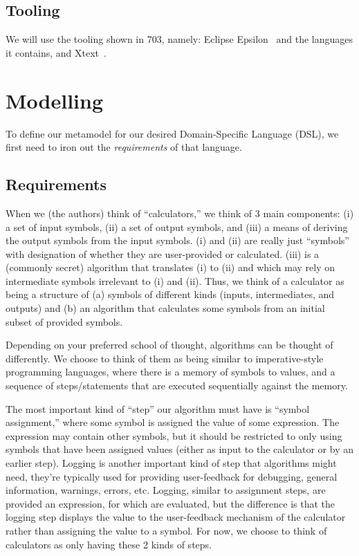 \documentclass[11pt,fleqn]{article}
\begin{document}
\subsection{Tooling}
\label{sec:introduction:subsec:tooling}

We will use the tooling shown in 703, namely: Eclipse Epsilon~\cite{Epsilon} and
the languages it contains, and Xtext~\cite{Xtext}.

\newpage{}

\section{Modelling}
\label{sec:modelling}

To define our metamodel for our desired Domain-Specific Language (DSL), we first
need to iron out the \textit{requirements} of that language.

\subsection{Requirements}
\label{sec:modelling:subsec:requirements}

When we (the authors) think of ``calculators,'' we think of 3 main components:
(i) a set of input symbols, (ii) a set of output symbols, and (iii) a means of
deriving the output symbols from the input symbols. (i) and (ii) are really just
``symbols'' with designation of whether they are user-provided or calculated.
(iii) is a (commonly secret) algorithm that translates (i) to (ii) and which may
rely on intermediate symbols irrelevant to (i) and (ii). Thus, we think of a
calculator as being a structure of (a) symbols of different kinds (inputs,
intermediates, and outputs) and (b) an algorithm that calculates some symbols
from an initial subset of provided symbols.

Depending on your preferred school of thought, algorithms can be thought of
differently. We choose to think of them as being similar to imperative-style
programming languages, where there is a memory of symbols to values, and a
sequence of steps/statements that are executed sequentially against the memory.

The most important kind of ``step'' our algorithm must have is ``symbol
assignment,'' where some symbol is assigned the value of some expression. The
expression may contain other symbols, but it should be restricted to only using
symbols that have been assigned values (either as input to the calculator or by
an earlier step). Logging is another important kind of step that algorithms
might need, they're typically used for providing user-feedback for debugging,
general information, warnings, errors, etc. Logging, similar to assignment
steps, are provided an expression, for which are evaluated, but the difference
is that the logging step displays the value to the user-feedback mechanism of
the calculator rather than assigning the value to a symbol. For now, we choose
to think of calculators as only having these 2 kinds of steps.
\end{document}
